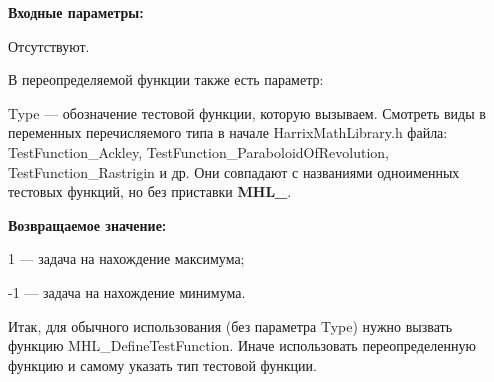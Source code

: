 \textbf{Входные параметры:}

Отсутствуют.

В переопределяемой функции также есть параметр:
  
Type --- обозначение тестовой функции, которую вызываем.
Смотреть виды в переменных перечисляемого типа в начале HarrixMathLibrary.h файла: TestFunction\_Ackley, TestFunction\_ParaboloidOfRevolution, TestFunction\_Rastrigin и др. Они совпадают с названиями одноименных тестовых функций, но без приставки \textbf{MHL\_}.

\textbf{Возвращаемое значение:}
 
1 --- задача на нахождение максимума;

-1 --- задача на нахождение минимума.

Итак, для обычного использования (без параметра Type) нужно вызвать функцию MHL\_DefineTestFunction. Иначе использовать переопределенную функцию и самому указать тип тестовой функции.